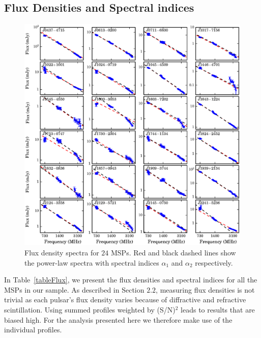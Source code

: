 \documentclass[useAMS,usenatbib]{mn2e}
\begin{document}
\subsection{Flux Densities and Spectral indices}

\begin{figure}
\begin{center}
\includegraphics[width=6 in]{specIndex.ps}
\caption{Flux density spectra for $24$ MSPs. Red and black dashed lines show the power-law 
spectra with spectral indices $\alpha_1$ and $\alpha_2$ respectively.} 
\label{index}
\end{center}
\end{figure}

In Table~\ref{tableFlux}, we present the flux densities and spectral indices 
for all the MSPs in our sample. As described in Section $2.2$, measuring flux 
densities is not trivial as each pulsar's flux density varies because 
of diffractive and refractive scintillation. Using summed profiles weighted by 
(S/N)$^2$ leads to results that are biased high. For the analysis presented 
here we therefore make use of the individual profiles. 
%
\end{document}
